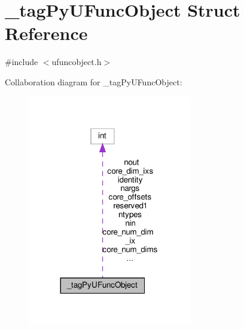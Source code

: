 \hypertarget{struct__tagPyUFuncObject}{}\section{\+\_\+tag\+Py\+U\+Func\+Object Struct Reference}
\label{struct__tagPyUFuncObject}


{\ttfamily \#include $<$ufuncobject.\+h$>$}



Collaboration diagram for \+\_\+tag\+Py\+U\+Func\+Object\+:
\nopagebreak
\begin{figure}[H]
\begin{center}
\leavevmode
\includegraphics[width=203pt]{struct__tagPyUFuncObject__coll__graph}
\end{center}
\end{figure}
